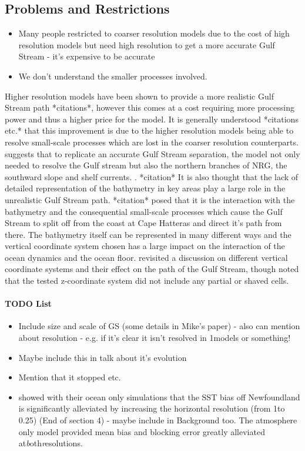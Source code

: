 \documentclass[..\EOYR.tex]{subfiles}
\begin{document}
\subsection{Problems and Restrictions}
\begin{itemize}
  \item Many people restricted to coarser resolution models due to the cost of high resolution models but need high resolution to get a more accurate Gulf Stream - it's expensive to be accurate
  \item We don't understand the smaller processes involved. \citep{Nikurashin2012a}
\end{itemize}
Higher resolution models have been shown to provide a more realistic Gulf Stream path *citations*, however this comes at a cost requiring more processing power and thus a higher price for the model. It is generally understood *citations \citep{Nikurashin2012a} etc.* that this improvement is due to the higher resolution models being able to resolve small-scale processes which are lost in the coarser resolution counterparts. \citep{Ezer2016b} suggests that to replicate an accurate Gulf Stream separation, the model not only needed to resolve the Gulf stream but also the northern branches of NRG, the southward slope and shelf currents. . *citation* It is also thought that the lack of detailed representation of the bathymetry in key areas play a large role in the unrealistic Gulf Stream path. *citation* posed that it is the interaction with the bathymetry and the consequential small-scale processes which cause the Gulf Stream to split off from the coast at Cape Hatteras and direct it’s path from there. The bathymetry itself can be represented in many different ways and the vertical coordinate system chosen has a large impact on the interaction of the ocean dynamics and the ocean floor. \citep{Ezer2016b} revisited a discussion on different vertical coordinate systems and their effect on the path of the Gulf Stream, though noted that the tested z-coordinate system did not include any partial or shaved cells. 

\paragraph{TODO List}
\begin{itemize}
	\item Include size and scale of GS (some details in Mike's paper) - also can mention about resolution - e.g. if it's clear it isn't resolved in 1\degree models or something!
	\item Maybe include this in talk about it's evolution
	\item Mention that it stopped etc.
	\item \citep{Scaife2011a} showed with their ocean only simulations that the SST bias off Newfoundland is significantly alleviated by increasing the horizontal resolution (from 1\degree to 0.25\degree) (End of section 4) - maybe include in Background too. The atmosphere only model provided mean bias and blocking error greatly alleviated at\textit both\textit resolutions.
\end{itemize}
\end{document}
